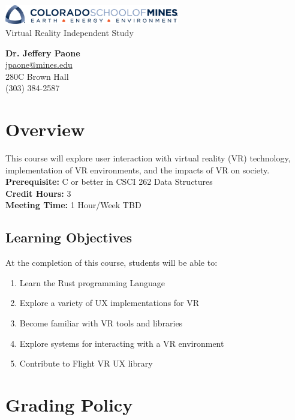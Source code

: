 \documentclass[11pt]{article}
\begin{document}
\begin{center}
    \includegraphics[width=3in]{logo-mines.png}
    \vspace{10mm}\\
    \LARGE Virtual Reality Independent Study
    \vspace{10mm}
\end{center}

\textbf{Dr. Jeffery Paone} \\
\url{jpaone@mines.edu} \\
280C Brown Hall \\
(303) 384-2587

\section{Overview}
This course will explore user interaction with virtual reality (VR) technology,
implementation of VR environments, and the impacts of VR on society. \\

\textbf{Prerequisite:} C or better in CSCI 262 Data Structures \\
\textbf{Credit Hours:} 3 \\
\textbf{Meeting Time:} 1 Hour/Week TBD

\subsection{Learning Objectives}
At the completion of this course, students will be able to:
\begin{enumerate} \itemsep-0.4em
    \item Learn the Rust programming Language
    \item Explore a variety of UX implementations for VR
    \item Become familiar with VR tools and libraries
    \item Explore systems for interacting with a VR environment
    \item Contribute to Flight VR UX library
\end{enumerate}

\newpage
\section{Grading Policy}
\end{document}
